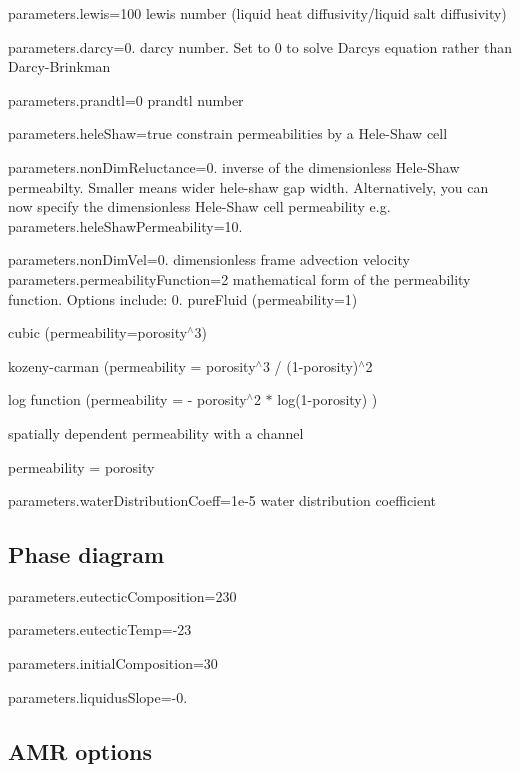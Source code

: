 {\ttfamily parameters.\+lewis=100} lewis number (liquid heat diffusivity/liquid salt diffusivity)

{\ttfamily parameters.\+darcy=0.} darcy number. Set to 0 to solve Darcy\textquotesingle{}s equation rather than Darcy-\/\+Brinkman

{\ttfamily parameters.\+prandtl=0} prandtl number

{\ttfamily parameters.\+hele\+Shaw=true} constrain permeabilities by a Hele-\/\+Shaw cell

{\ttfamily parameters.\+non\+Dim\+Reluctance=0.} inverse of the dimensionless Hele-\/\+Shaw permeabilty. Smaller means wider hele-\/shaw gap width. Alternatively, you can now specify the dimensionless Hele-\/\+Shaw cell permeability e.\+g. {\ttfamily parameters.\+hele\+Shaw\+Permeability=10.}

{\ttfamily parameters.\+non\+Dim\+Vel=0.} dimensionless frame advection velocity {\ttfamily parameters.\+permeability\+Function=2} mathematical form of the permeability function. Options include\+: 0. pure\+Fluid (permeability=1)
\begin{DoxyEnumerate}
\item cubic (permeability=porosity$^\wedge$3)
\item kozeny-\/carman (permeability = porosity$^\wedge$3 / (1-\/porosity)$^\wedge$2
\item log function (permeability = -\/ porosity$^\wedge$2 $\ast$ log(1-\/porosity) )
\item spatially dependent permeability with a channel
\item permeability = porosity
\end{DoxyEnumerate}

{\ttfamily parameters.\+water\+Distribution\+Coeff=1e-\/5} water distribution coefficient

\subsection*{Phase diagram}

{\ttfamily parameters.\+eutectic\+Composition=230}

{\ttfamily parameters.\+eutectic\+Temp=-\/23}

{\ttfamily parameters.\+initial\+Composition=30}

{\ttfamily parameters.\+liquidus\+Slope=-\/0.}

\subsection*{\textbf{ A\+MR} options}


